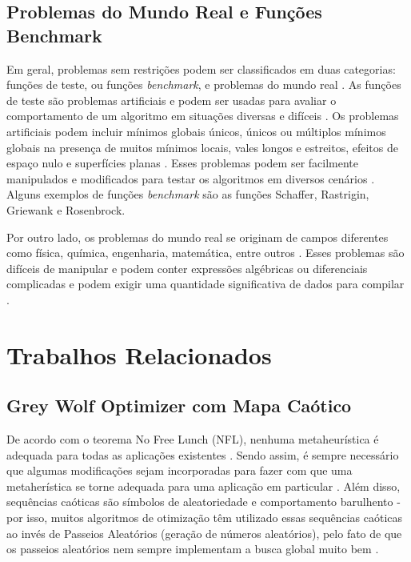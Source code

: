 \section{Problemas do Mundo Real e Funções Benchmark}

Em geral, problemas sem restrições podem ser classificados em duas categorias: funções de teste, ou funções \textit{benchmark}, e problemas do mundo real \cite{jamil}. As funções de teste são problemas artificiais e podem ser usadas para avaliar o comportamento de um algoritmo em situações diversas e difíceis \cite{jamil}. Os problemas artificiais podem incluir mínimos globais únicos, únicos ou múltiplos mínimos globais na presença de muitos mínimos locais, vales longos e estreitos, efeitos de espaço nulo e superfícies planas \cite{jamil}. Esses problemas podem ser facilmente manipulados e modificados para testar os algoritmos em diversos cenários \cite{jamil}. Alguns exemplos de funções \textit{benchmark} são as funções Schaffer, Rastrigin, Griewank e Rosenbrock. 

Por outro lado, os problemas do mundo real se originam de campos diferentes como física, química, engenharia, matemática, entre outros \cite{jamil}. Esses problemas são difíceis de manipular e podem conter expressões algébricas ou diferenciais complicadas e podem exigir uma quantidade significativa de dados para compilar \cite{jamil}. 

\chapter{Trabalhos Relacionados} \label{chap2}

\section{Grey Wolf Optimizer com Mapa Caótico}

De acordo com o teorema No Free Lunch (NFL), nenhuma metaheurística é adequada para todas as aplicações existentes \cite{saxena}. Sendo assim, é sempre necessário que algumas modificações sejam incorporadas para fazer com que uma metaherística se torne adequada para uma aplicação em particular \cite{saxena}. Além disso, sequências caóticas são símbolos de aleatoriedade e comportamento barulhento - por isso, muitos algoritmos de otimização têm utilizado essas sequências caóticas ao invés de Passeios Aleatórios (geração de números aleatórios), pelo fato de que os passeios aleatórios nem sempre implementam a busca global muito bem \cite{saxena}.

